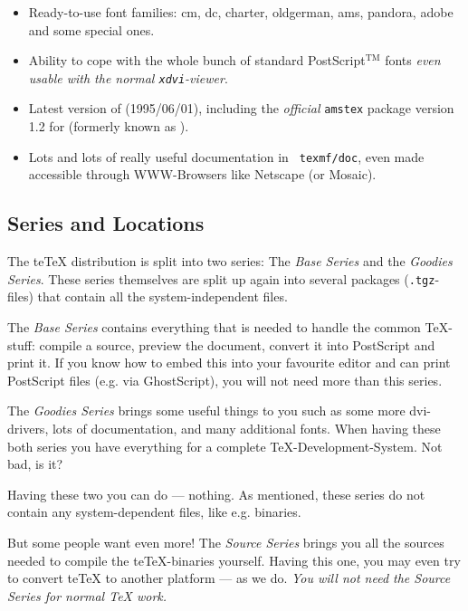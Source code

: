 \documentclass[12pt,a4paper]{article}
\newcommand{\teTeX}{\textrm{te}\TeX\xspace}
\begin{document}
\begin{itemize}
\item Ready-to-use font families: cm, dc, charter,
  oldgerman, ams, pandora, adobe and some special ones.
  
\item Ability to cope with the whole bunch of standard
  PostScript$^{\textrm{TM}}$ fonts \emph{even usable with the
    normal {\tt xdvi}-viewer}.
  
\item Latest version of \LaTeXe{} (1995/06/01), including
  the \emph{official} {\tt amstex} package version 1.2 for
  \LaTeXe{} (formerly known as \AmSLaTeX{}).
  
\item Lots and lots of really useful documentation in {\tt
    texmf/doc}, even made accessible through WWW-Browsers
  like Netscape (or Mosaic).

\end{itemize}

\subsection{Series and Locations}
\label{ssec:pac}

The \teTeX distribution is split into two series: The
\emph{Base Series} and the \emph{Goodies Series}. These
series themselves are split up again into several
packages ({\tt .tgz}-files) that contain all the
system-independent files.

\smallskip

The \emph{Base Series} contains everything that is needed to
handle the common \TeX{}-stuff: compile a source, preview
the document, convert it into PostScript and print it. If
you know how to embed this into your favourite editor and
can print PostScript files (e.g. via GhostScript), you will
not need more than this series.

The \emph{Goodies Series} brings some useful things to you
such as some more dvi-drivers,
lots of documentation, and many additional fonts. When
having these both series you have everything for a complete
\TeX{}-Development-System.  Not bad, is it?

Having these two you can do --- nothing. As mentioned, these
series do not contain any system-dependent files, like e.g.
binaries.

But some people want even more! The \emph{Source Series}
brings you all the sources needed to compile the
\teTeX{}-binaries yourself.  Having this one, you may even
try to convert \teTeX{} to another platform --- as we do.
\emph{You will not need the Source Series for normal \TeX{}
  work.}
\end{document}
